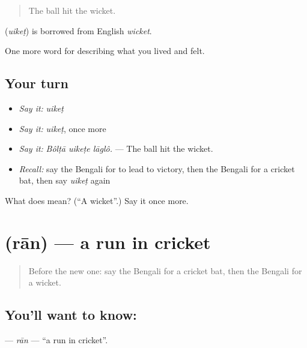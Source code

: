 \begin{quote}
The ball hit the wicket.
\end{quote}

\begin{cousinweb}
\textbf{} (\emph{uikeṭ}) is borrowed from English \emph{wicket}.
\end{cousinweb}

\begin{grammarlens}[title={What you've built}]
One more word for describing what you lived and felt.
\end{grammarlens}

\subsection*{Your turn}
\begin{itemize}
\raggedright
  \item \emph{Say it:} \emph{uikeṭ}
  \item \emph{Say it:} \emph{uikeṭ}, once more
  \item \emph{Say it:} \emph{Bôlṭā uikeṭe lāglô.} — The ball hit the wicket.
  \item \emph{Recall:} say the Bengali for to lead to victory, then the Bengali for a cricket bat, then say \emph{uikeṭ} again
\end{itemize}

\begin{tcolorbox}[breakable,colback=teal!4,colframe=teal!35!black,title={Before you move on}]
What does  mean? (\textquotedblleft{}A wicket\textquotedblright{}.) Say it once more.
\end{tcolorbox}
\section[\texorpdfstring{\bn{রান} (rān)}{রান (rān)}]{ (rān) — a run in cricket}

\label{lesson:BN-C521-ran}



\begin{quote}
Before the new one: say the Bengali for a cricket bat, then the Bengali for a wicket.
\end{quote}

\subsection*{You'll want to know: }
\textbf{} — \emph{rān} — \textquotedblleft{}a run in cricket\textquotedblright{}.

